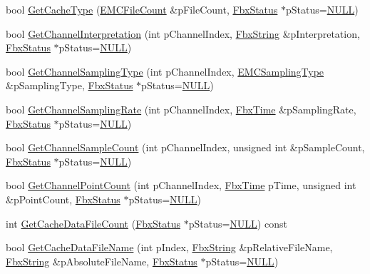 \begin{DoxyCompactItemize}
\item 
bool \hyperlink{class_fbx_cache_a587ab185d45dbd55ed042f5f0a01f30b}{Get\+Cache\+Type} (\hyperlink{class_fbx_cache_afa5d133385fbd74b59e619c692a9cc36}{E\+M\+C\+File\+Count} \&p\+File\+Count, \hyperlink{class_fbx_status}{Fbx\+Status} $\ast$p\+Status=\hyperlink{fbxarch_8h_a070d2ce7b6bb7e5c05602aa8c308d0c4}{N\+U\+LL})
\item 
bool \hyperlink{class_fbx_cache_a7eaddf9e8f0f583c4573f7f3203e226d}{Get\+Channel\+Interpretation} (int p\+Channel\+Index, \hyperlink{class_fbx_string}{Fbx\+String} \&p\+Interpretation, \hyperlink{class_fbx_status}{Fbx\+Status} $\ast$p\+Status=\hyperlink{fbxarch_8h_a070d2ce7b6bb7e5c05602aa8c308d0c4}{N\+U\+LL})
\item 
bool \hyperlink{class_fbx_cache_a5a2763e150c2687f989f1cf69a08cbc8}{Get\+Channel\+Sampling\+Type} (int p\+Channel\+Index, \hyperlink{class_fbx_cache_a9d4d8e73c5e2f510b7884ceaee13a173}{E\+M\+C\+Sampling\+Type} \&p\+Sampling\+Type, \hyperlink{class_fbx_status}{Fbx\+Status} $\ast$p\+Status=\hyperlink{fbxarch_8h_a070d2ce7b6bb7e5c05602aa8c308d0c4}{N\+U\+LL})
\item 
bool \hyperlink{class_fbx_cache_a31d16dc4cc821fe13021991579632002}{Get\+Channel\+Sampling\+Rate} (int p\+Channel\+Index, \hyperlink{class_fbx_time}{Fbx\+Time} \&p\+Sampling\+Rate, \hyperlink{class_fbx_status}{Fbx\+Status} $\ast$p\+Status=\hyperlink{fbxarch_8h_a070d2ce7b6bb7e5c05602aa8c308d0c4}{N\+U\+LL})
\item 
bool \hyperlink{class_fbx_cache_a2d0d0bd08638ef945a2e3aadcb26dee8}{Get\+Channel\+Sample\+Count} (int p\+Channel\+Index, unsigned int \&p\+Sample\+Count, \hyperlink{class_fbx_status}{Fbx\+Status} $\ast$p\+Status=\hyperlink{fbxarch_8h_a070d2ce7b6bb7e5c05602aa8c308d0c4}{N\+U\+LL})
\item 
bool \hyperlink{class_fbx_cache_a347e4b40780ae2ae0511d62350a806f7}{Get\+Channel\+Point\+Count} (int p\+Channel\+Index, \hyperlink{class_fbx_time}{Fbx\+Time} p\+Time, unsigned int \&p\+Point\+Count, \hyperlink{class_fbx_status}{Fbx\+Status} $\ast$p\+Status=\hyperlink{fbxarch_8h_a070d2ce7b6bb7e5c05602aa8c308d0c4}{N\+U\+LL})
\item 
int \hyperlink{class_fbx_cache_ab7f00992af7a2f0179184cba81d890a2}{Get\+Cache\+Data\+File\+Count} (\hyperlink{class_fbx_status}{Fbx\+Status} $\ast$p\+Status=\hyperlink{fbxarch_8h_a070d2ce7b6bb7e5c05602aa8c308d0c4}{N\+U\+LL}) const
\item 
bool \hyperlink{class_fbx_cache_aa4e5178a3f2a3b76ca96fcf24e326d3b}{Get\+Cache\+Data\+File\+Name} (int p\+Index, \hyperlink{class_fbx_string}{Fbx\+String} \&p\+Relative\+File\+Name, \hyperlink{class_fbx_string}{Fbx\+String} \&p\+Absolute\+File\+Name, \hyperlink{class_fbx_status}{Fbx\+Status} $\ast$p\+Status=\hyperlink{fbxarch_8h_a070d2ce7b6bb7e5c05602aa8c308d0c4}{N\+U\+LL})

\end{DoxyCompactItemize}
